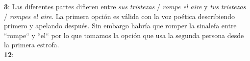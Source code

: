\noindent \textbf{3}: Las diferentes partes difieren entre \textit{sus tristezas} / \textit{rompe el aire} y \textit{tus tristezas} / \textit{rompes el aire}. La primera opción es válida con la voz poética describiendo primero y apelando después. Sin embargo habría que romper la sinalefa entre ``rompe`` y ``el`` por lo que tomamos la opción que usa la segunda persona desde la primera estrofa.\\
\textbf{12}: 
